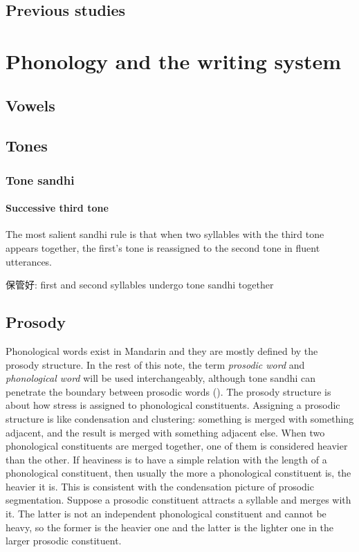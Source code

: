 \documentclass[UTF8, a4paper, oneside, scheme=plain, 12pt]{ctexrep}
\newcommand*{\term}[1]{\emph{#1}}
\begin{document}
\section{Previous studies}

\chapter{Phonology and the writing system}

\section{Vowels}

\section{Tones}

\subsection{Tone sandhi}\label{sec:phonology.tone-sandhi}

\subsubsection{Successive third tone}\label{sec:phonology.tone-sandhi.third}

The most salient sandhi rule is that 
when two syllables with the third tone appears together, 
the first's tone is reassigned to the second tone in 
fluent utterances. 

保管好: first and second syllables undergo tone sandhi together 

\section{Prosody}\label{sec:prosody-structure}

Phonological words exist in Mandarin 
and they are mostly defined by the prosody structure.
In the rest of this note,
the term \term{prosodic word} and \term{phonological word}
will be used interchangeably, 
although tone sandhi can penetrate 
the boundary between prosodic words
().
The prosody structure is about how stress is assigned to phonological constituents.
Assigning a prosodic structure is like condensation and clustering:
something is merged with something adjacent,
and the result is merged with something adjacent else.
When two phonological constituents are merged together,
one of them is considered heavier than the other.
If heaviness is to have a simple relation with the length of a phonological constituent,
then usually the more a phonological constituent is,
the heavier it is.
This is consistent with the condensation picture of prosodic segmentation.
Suppose a prosodic constituent attracts a syllable and merges with it.
The latter is not an independent phonological constituent
and cannot be heavy,
so the former is the heavier one and the latter is the lighter one in the larger prosodic constituent.
\end{document}
